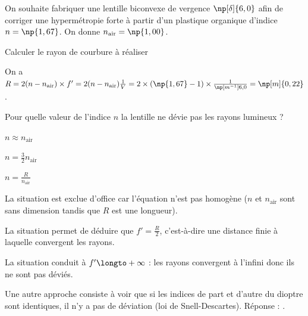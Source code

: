 \debutEntrainement


\smallskip

On souhaite fabriquer une lentille biconvexe de vergence $\np[\delta]{6,0}$ afin de corriger une hypermétropie forte à partir d'un plastique organique d'indice $n=\np{1,67}$. On donne $n_{\text{air}}=\np{1,00}$.

\begin{enonce}
Calculer le rayon de courbure à réaliser
\end{enonce}


\begin{corrige}
On a $R=2(n-n_{\text{air}})\times f'=2(n-n_{\text{air}})\frac{1}{V}=2\times(\np{1,67}-1)\times \frac{1}{\np[m^{-1}]{6,0}}=\np[m]{0,22}$.
\end{corrige}




\begin{enonce}
Pour quelle valeur de l'indice $n$ la lentille ne dévie pas les rayons lumineux ?
	\begin{listeQCM3Colonnes}
	\item $n \approx n_{\text{air}}$
	\item $n= \frac{3}{2}n_{\text{air}}$
	\item $n=\frac{R}{n_{\text{air}}}$
	\end{listeQCM3Colonnes}
\end{enonce}

\reponse{\reponseA{}}

\begin{corrigeNewpage}
La situation \reponseC{} est exclue d'office car l'équation n'est pas homogène ($n$ et $n_{\text{air}}$ sont sans dimension tandis que $R$ est une longueur). 

La situation \reponseB{} permet de déduire que $f' = \frac{R}{2}$, c'est-à-dire une distance finie à laquelle convergent les rayons. 

La situation \reponseA{} conduit à $f' \longto +\infty$ : les rayons convergent à l'infini donc ils ne sont pas déviés. 

Une autre approche consiste à voir que si les indices de part et d'autre du dioptre sont identiques, il n'y a pas de déviation (loi de Snell-Descartes). Réponse : \reponseA{}.   
\end{corrigeNewpage}

